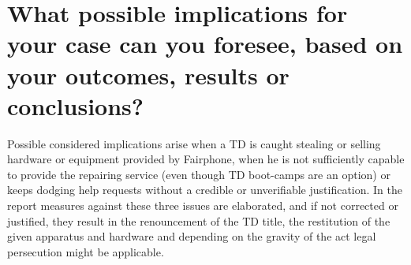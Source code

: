 \section{What possible implications for your case can you foresee, based on your outcomes, results or conclusions?}

Possible considered implications arise when a TD is caught stealing or selling hardware or equipment provided by Fairphone, when he is not sufficiently capable to provide the repairing service (even though TD boot-camps are an option) or keeps dodging help requests without a credible or unverifiable justification. In the report measures against these three issues are elaborated, and if not corrected or justified, they result in the renouncement of the TD title, the restitution of the given apparatus and hardware and depending on the gravity of the act legal persecution might be applicable.
